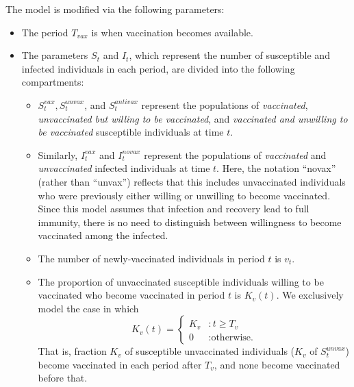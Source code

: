 \documentclass{article}
\begin{document}
The model is modified via the following parameters:
\begin{itemize}
    \item The period $T_{vax}$ is when vaccination becomes available.
    \item The parameters $S_t$ and $I_t$, which represent the number of susceptible and infected individuals in each period, are divided into the following compartments:
    \begin{itemize}
        \item $S_t^{vax}, S_t^{unvax}$, and $S_t^{antivax}$ represent the populations of \emph{vaccinated}, \emph{unvaccinated but willing to be vaccinated}, and \emph{vaccinated and unwilling to be vaccinated} susceptible individuals at time $t$.

        \item Similarly, $I_t^{vax}$ and $I_t^{novax}$ represent the populations of \emph{vaccinated} and \emph{unvaccinated} infected individuals at time $t$. Here, the notation ``novax'' (rather than ``unvax'') reflects that this includes unvaccinated individuals who were previously either willing or unwilling to become vaccinated. Since this model assumes that infection and recovery lead to full immunity, there is no need to distinguish between willingness to become vaccinated among the infected.

        \item The number of newly-vaccinated individuals in period $t$ is $v_t$. 

        \item The proportion of unvaccinated susceptible individuals willing to be vaccinated who become vaccinated in period $t$ is $K_v(t)$. We exclusively model the case in which
        \begin{equation}\label{eq:kvt}
            K_v(t) = \begin{cases}K_v &: \text{$t\ge T_v$}\\ 0 &: \text{otherwise.}\end{cases}
        \end{equation}
        That is, fraction $K_v$ of susceptible unvaccinated individuals ($K_v$ of $S_t^{unvax}$) become vaccinated in each period after $T_v$, and none become vaccinated before that.

    \end{itemize}


\end{itemize}
\end{document}
